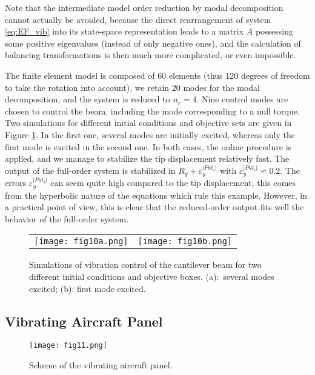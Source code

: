   Note that the intermediate model order reduction by modal decomposition cannot actually be avoided, because 
  the direct rearrangement of system \eqref{eq:EF_vib} into its state-space representation leads
  to a matrix $A$ possessing some positive eigenvalues (instead of only negative ones),
  and the calculation of balancing transformations is then much more complicated, or even impossible.
 
 The finite element model is composed of $60$ elements (thus $120$ degrees of
 freedom to take the rotation into account), we retain $20$ modes 
 for the modal decomposition, and the system is reduced to $n_r = 4$.
 Nine control modes are chosen to control the beam, including the mode
 corresponding to a null torque.
 Two simulations for different initial conditions and
 objective sets are given in Figure \ref{fig:fig10}.
 In the first one, several modes are initially excited, whereas only the first mode is 
 excited in the second one. 
 In both cases, the online procedure is applied, 
 and we manage to stabilize the tip displacement relatively fast.
 The output of the full-order system is stabilized in $R_y + \varepsilon_y^{\vert Pat_i \vert}$
 with $\varepsilon_y^{\vert Pat_i \vert} \backsimeq 0.2$. The errors $\varepsilon_y^{\vert Pat_i \vert}$
 can seem quite high compared to the tip displacement, this comes from the hyperbolic
 nature of the equations which rule this example. However, in a practical point of view, this 
 is clear that the reduced-order output fits well the behavior of the full-order system.
  
  
  \begin{figure}[ht]
  \centering
   \begin{tabular}{cc}
    \texttt{[image: fig10a.png]}
    & 
    \texttt{[image: fig10b.png]}
   \end{tabular}
  \caption{Simulations of vibration control of the cantilever beam for two different initial conditions and objective boxes. (a):~several modes excited; (b): first mode excited.}
  \label{fig:fig10}
  \end{figure}

  
  \subsection{Vibrating Aircraft Panel}
 
    \begin{figure}[ht]
    \centering
  \texttt{[image: fig11.png]}
  \caption{Scheme of the vibrating aircraft panel.}
  \label{fig:fig11}
  \end{figure}
 
